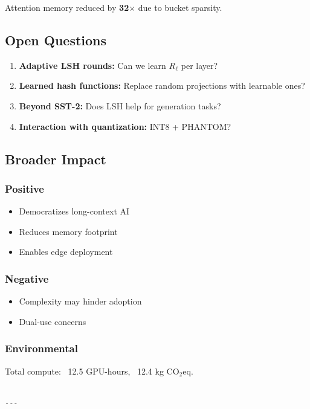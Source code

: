 Attention memory reduced by \textbf{32$\times$} due to bucket sparsity.

\subsection{Open Questions}

\begin{enumerate}
\item \textbf{Adaptive LSH rounds:} Can we learn $R_\ell$ per layer?
\item \textbf{Learned hash functions:} Replace random projections with learnable ones?
\item \textbf{Beyond SST-2:} Does LSH help for generation tasks?
\item \textbf{Interaction with quantization:} INT8 + PHANTOM?

\end{enumerate}
\subsection{Broader Impact}

\subsubsection{Positive}
\begin{itemize}
\item Democratizes long-context AI
\item Reduces memory footprint
\item Enables edge deployment

\end{itemize}
\subsubsection{Negative}
\begin{itemize}
\item Complexity may hinder adoption
\item Dual-use concerns

\end{itemize}
\subsubsection{Environmental}
Total compute: ~12.5 GPU-hours, ~12.4 kg CO$_2$eq.
\begin{lstlisting}

---
\end{lstlisting}